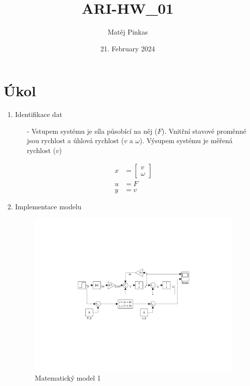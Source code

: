 \documentclass{article}
\title{ARI-HW\_01}
\author{Matěj Pinkas}
\date{21. February 2024}
\newcommand\mat[1]{\begin{bmatrix}#1\end{bmatrix}}
\newcommand\hw[1]{\stepcounter{section}\section*{Úkol \thesection\quad #1}}
\begin{document}
\maketitle

\hw{}


\begin{enumerate}
    
    \item Identifikace dat
        \begin{itemize}
            \item[-] Vstupem systému je síla působící na něj ($F$). Vnitřní stavové proměnné jsou rychlost a úhlová rychlost ($v$ a $\omega$). Výsupem systému je měřená rychlost ($v$)
        \end{itemize}
        \begin{align*}
            x &= \mat{v\\ \omega}\\
            u &= F\\
            y &= v
        \end{align*}
    
    \item Implementace modelu
    \begin{figure}[H]
        \centering
        \includegraphics[clip,trim=6.1cm 7.2cm 6.1cm 7.2cm, width=1.00\textwidth]{Figures/ARI_HW1_Circuit_1.pdf}
        \caption{Matematický model 1}
        \label{fig:Model_1}
    \end{figure}



\end{enumerate}
\end{document}
